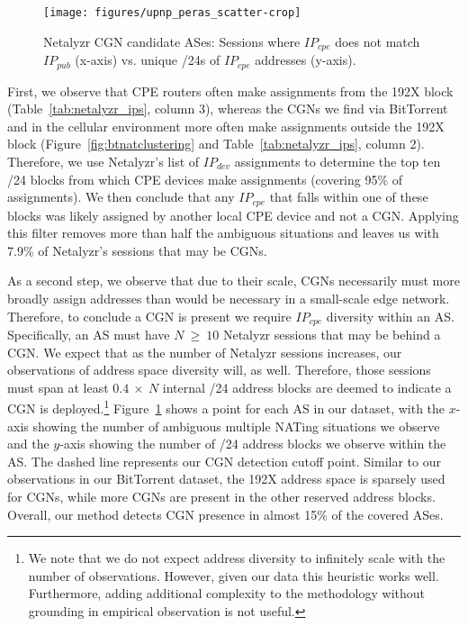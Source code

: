 \documentclass[10pt]{sig-alternate-05-2015}
\newcommand{\neta}{Netalyzr\xspace}
\begin{document}
 \begin{figure}
   \begin{center}
\texttt{[image: figures/upnp\_peras\_scatter-crop]}
   \caption{Netalyzr CGN candidate ASes: Sessions where $IP_{cpe}$ does not 
   match $IP_{pub}$ (x-axis) vs. unique /24s of $IP_{cpe}$ addresses 
   (y-axis).}
     \label{fig:upnpasscatter}
   \end{center}
   \vspace{-1em}
 \end{figure}

First, we observe that CPE routers often make assignments from the
192X block (Table~\ref{tab:netalyzr_ips}, column 3), whereas the
CGNs we find via BitTorrent and in the cellular environment more
often make assignments outside the 192X block
(Figure~\ref{fig:btnatclustering} and
Table~\ref{tab:netalyzr_ips}, column 2).  Therefore, we use \neta's
list of $IP_{dev}$ assignments to determine the top ten
/24 blocks from which CPE devices make assignments (covering 95\% of
assignments).  We then conclude that any $IP_{cpe}$ that falls
within one of these blocks was likely assigned by another local CPE
device and not a CGN.  Applying this filter removes more than half
the ambiguous situations and leaves us with 7.9\% of \neta's
sessions that may be CGNs.

As a second step, we observe that due to their scale, CGNs
necessarily must more broadly assign addresses than would be
necessary in a small-scale edge network.  Therefore, to conclude a
CGN is present we require $IP_{cpe}$ diversity within an AS.
Specifically, an AS must have $N~\ge~10$ \neta sessions that may be
behind a CGN.  We expect that as the number of \neta sessions
increases, our observations of address space diversity will, as
well.  Therefore, those sessions must span at least $0.4~\times~N$
internal /24 address blocks are deemed to indicate a CGN is
deployed.\footnote{We note that we do not expect address diversity
  to infinitely scale with the number of observations.  However,
  given our data this heuristic works well.  Furthermore, adding additional
  complexity to the methodology without grounding in empirical
  observation is not useful.}  Figure~\ref{fig:upnpasscatter} shows
a point for each AS in our dataset, with the $x$-axis showing the
number of ambiguous multiple NATing situations we observe and the
$y$-axis showing the number of /24 address blocks we observe within
the AS.  The dashed line represents our CGN detection cutoff point.
Similar to our observations in our BitTorrent dataset, the 192X
address space is sparsely used for CGNs, while more CGNs are present
in the other reserved address blocks.  Overall, our method detects
CGN presence in almost 15\% of the covered ASes.
\end{document}
